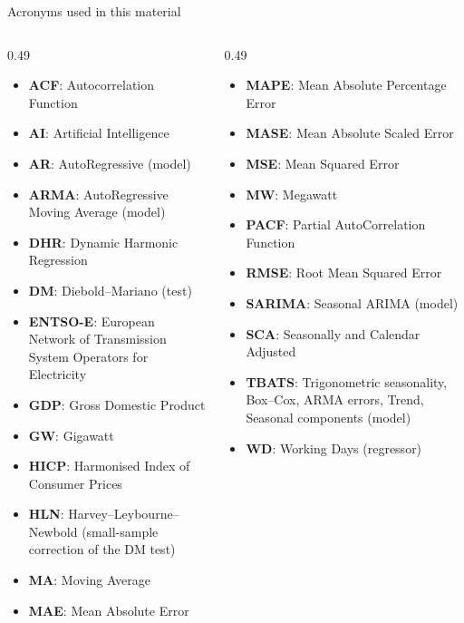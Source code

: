 {
\begin{frame}[noframenumbering]
    \titlepage
\end{frame}
}
\begin{frame}{Acronyms used in this material}
\begin{columns}[T]
\begin{column}{0.49\textwidth}
\begin{itemize}\setlength{\itemsep}{0pt}
    \item \textbf{ACF}: Autocorrelation Function
    \item \textbf{AI}: Artificial Intelligence
    \item \textbf{AR}: AutoRegressive (model)
    \item \textbf{ARMA}: AutoRegressive Moving Average (model)
    \item \textbf{DHR}: Dynamic Harmonic Regression
    \item \textbf{DM}: Diebold–Mariano (test)
    \item \textbf{ENTSO-E}: European Network of Transmission System Operators for Electricity
    \item \textbf{GDP}: Gross Domestic Product
    \item \textbf{GW}: Gigawatt
    \item \textbf{HICP}: Harmonised Index of Consumer Prices
    \item \textbf{HLN}: Harvey–Leybourne–Newbold (small-sample correction of the DM test)
    \item \textbf{MA}: Moving Average
    \item \textbf{MAE}: Mean Absolute Error
\end{itemize}
\end{column}
\begin{column}{0.49\textwidth}
\begin{itemize}\setlength{\itemsep}{0pt}
    \item \textbf{MAPE}: Mean Absolute Percentage Error
    \item \textbf{MASE}: Mean Absolute Scaled Error
    \item \textbf{MSE}: Mean Squared Error
    \item \textbf{MW}: Megawatt
    \item \textbf{PACF}: Partial AutoCorrelation Function
    \item \textbf{RMSE}: Root Mean Squared Error
    \item \textbf{SARIMA}: Seasonal ARIMA (model)
    \item \textbf{SCA}: Seasonally and Calendar Adjusted
    \item \textbf{TBATS}: Trigonometric seasonality, Box–Cox, ARMA errors, Trend, Seasonal components (model)
    \item \textbf{WD}: Working Days (regressor)
\end{itemize}
\end{column}
\end{columns}
\end{frame}

